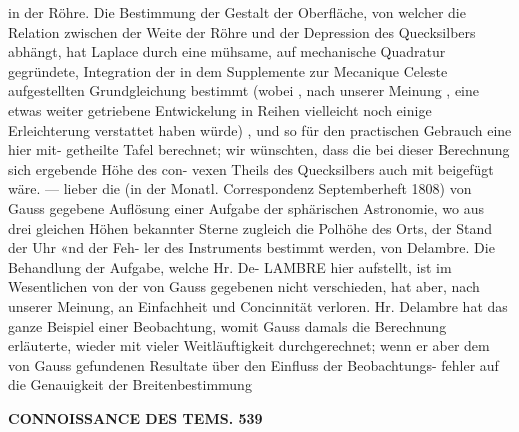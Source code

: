 \documentclass[12pt,a4paper]{article}
\begin{document}
in  der  Röhre.  Die Bestimmung  der  Gestalt  der  Oberfläche,  von  welcher  die  Relation  zwischen  der  Weite  der  Röhre  und der  Depression  des  Quecksilbers  abhängt,  hat  Laplace  durch  eine  mühsame,  auf  mechanische  Quadratur gegründete,  Integration  der  in  dem  Supplemente  zur  Mecanique  Celeste  aufgestellten  Grundgleichung bestimmt  (wobei ,  nach  unserer  Meinung ,  eine  etwas  weiter  getriebene  Entwickelung  in  Reihen  vielleicht noch  einige  Erleichterung  verstattet  haben  würde) ,  und  so  für  den  practischen  Gebrauch  eine  hier  mit- getheilte  Tafel  berechnet;  wir  wünschten,  dass  die  bei  dieser  Berechnung  sich  ergebende  Höhe  des  con- vexen  Theils  des  Quecksilbers  auch  mit  beigefügt  wäre.  ---  lieber  die  (in  der  Monatl.  Correspondenz Septemberheft  1808)  von  Gauss  gegebene  Auflösung  einer  Aufgabe  der  sphärischen  Astronomie,  wo  aus drei  gleichen  Höhen  bekannter  Sterne  zugleich  die  Polhöhe  des  Orts,  der  Stand  der  Uhr  «nd  der  Feh- ler des  Instruments  bestimmt  werden,  von  Delambre.  Die  Behandlung  der  Aufgabe,  welche  Hr.  De- LAMBRE  hier  aufstellt,  ist  im  Wesentlichen  von  der  von  Gauss  gegebenen  nicht  verschieden,  hat  aber, nach  unserer  Meinung,  an  Einfachheit  und  Concinnität  verloren.  Hr.  Delambre  hat  das  ganze  Beispiel einer  Beobachtung,  womit  Gauss  damals  die  Berechnung  erläuterte,  wieder  mit  vieler  Weitläuftigkeit durchgerechnet;  wenn  er  aber  dem  von  Gauss  gefundenen  Resultate  über  den  Einfluss  der  Beobachtungs- fehler auf  die  Genauigkeit  der  Breitenbestimmung

\vspace{0.5em}


\noindent\textbf{CONNOISSANCE  DES  TEMS.  539}
\end{document}
